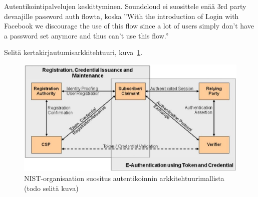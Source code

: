 \documentclass[finnish,gradu]{tktltiki}
\begin{document}
  Autentikointipalvelujen keskittyminen. Soundcloud ei suosittele enää 3rd party devaajille password auth flowta, koska ''With the introduction of Login with Facebook we discourage the use of this flow since a lot of users simply don't have a password set anymore and thus can't use this flow.''


  Selitä kertakirjautumisarkkitehtuuri, kuva~\ref{fig:kertakirjautumisarkkitehtuurin_yleiskuva}.
  \begin{figure}
    \centering
    \includegraphics[width=1.0\textwidth]{images/NIST_authentication_architectural_model.jpg}
    \caption{NIST-organisaation suositus autentikoinnin arkkitehtuurimallista \cite{NIST_SP800-63-1} (todo selitä kuva) }
    \label{fig:kertakirjautumisarkkitehtuurin_yleiskuva}
  \end{figure}











\end{document}
